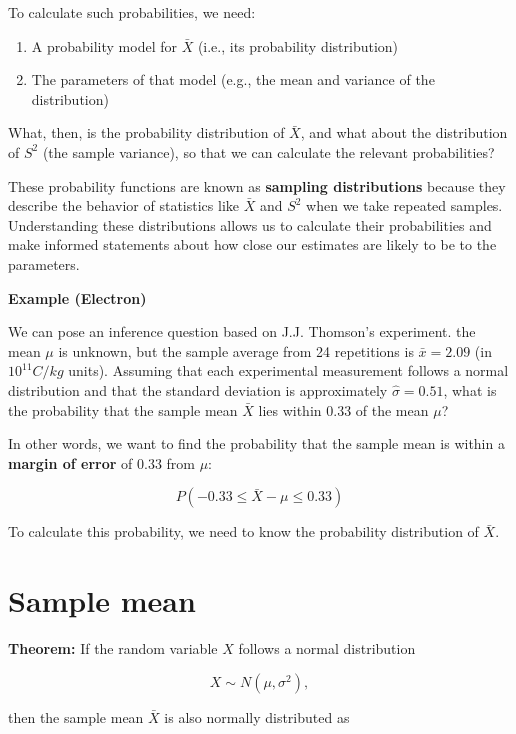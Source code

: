 \documentclass[
]{book}
\begin{document}
To calculate such probabilities, we need:

\begin{enumerate}
\def\labelenumi{\arabic{enumi}.}
\item
  A probability model for \(\bar{X}\) (i.e., its probability distribution)
\item
  The parameters of that model (e.g., the mean and variance of the distribution)
\end{enumerate}

What, then, is the probability distribution of \(\bar{X}\), and what about the distribution of \(S^2\) (the sample variance), so that we can calculate the relevant probabilities?

These probability functions are known as \textbf{sampling distributions} because they describe the behavior of statistics like \(\bar{X}\) and \(S^2\) when we take repeated samples. Understanding these distributions allows us to calculate their probabilities and make informed statements about how close our estimates are likely to be to the parameters.

\textbf{Example (Electron)}

We can pose an inference question based on J.J. Thomson's experiment. the mean \(\mu\) is unknown, but the sample average from 24 repetitions is \(\bar{x} = 2.09\) (in \(10^{11} C/kg\) units). Assuming that each experimental measurement follows a normal distribution and that the standard deviation is approximately \(\hat{\sigma} = 0.51\), what is the probability that the sample mean \(\bar{X}\) lies within \(0.33\) of the mean \(\mu\)?

In other words, we want to find the probability that the sample mean is within a \textbf{margin of error} of \(0.33\) from \(\mu\):

\[
P(-0.33 \leq \bar{X} - \mu \leq 0.33)
\]

To calculate this probability, we need to know the probability distribution of \(\bar{X}\).

\hypertarget{sample-mean}{%
\section{Sample mean}\label{sample-mean}}

\textbf{Theorem:} If the random variable \(X\) follows a normal distribution

\[
X \sim N(\mu, \sigma^2),
\]

then the sample mean \(\bar{X}\) is also normally distributed as
\end{document}
